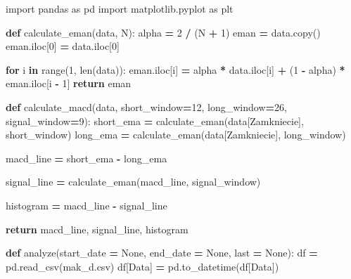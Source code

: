 \documentclass[
]{article}
\newenvironment{Shaded}{\begin{snugshade}}{\end{snugshade}}
\newcommand{\BuiltInTok}[1]{#1}
\newcommand{\ControlFlowTok}[1]{\textcolor[rgb]{0.13,0.29,0.53}{\textbf{#1}}}
\newcommand{\DecValTok}[1]{\textcolor[rgb]{0.00,0.00,0.81}{#1}}
\newcommand{\ImportTok}[1]{#1}
\newcommand{\KeywordTok}[1]{\textcolor[rgb]{0.13,0.29,0.53}{\textbf{#1}}}
\newcommand{\NormalTok}[1]{#1}
\newcommand{\OperatorTok}[1]{\textcolor[rgb]{0.81,0.36,0.00}{\textbf{#1}}}
\newcommand{\StringTok}[1]{\textcolor[rgb]{0.31,0.60,0.02}{#1}}
\newcommand{\VariableTok}[1]{\textcolor[rgb]{0.00,0.00,0.00}{#1}}
\begin{document}
\begin{Shaded}
\begin{Highlighting}[]
\ImportTok{import}\NormalTok{ pandas }\ImportTok{as}\NormalTok{ pd}
\ImportTok{import}\NormalTok{ matplotlib.pyplot }\ImportTok{as}\NormalTok{ plt}

\KeywordTok{def}\NormalTok{ calculate\_eman(data, N):}
\NormalTok{    alpha }\OperatorTok{=} \DecValTok{2} \OperatorTok{/}\NormalTok{ (N }\OperatorTok{+} \DecValTok{1}\NormalTok{)}
\NormalTok{    eman }\OperatorTok{=}\NormalTok{ data.copy()}
\NormalTok{    eman.iloc[}\DecValTok{0}\NormalTok{] }\OperatorTok{=}\NormalTok{ data.iloc[}\DecValTok{0}\NormalTok{]}

    \ControlFlowTok{for}\NormalTok{ i }\KeywordTok{in} \BuiltInTok{range}\NormalTok{(}\DecValTok{1}\NormalTok{, }\BuiltInTok{len}\NormalTok{(data)):}
\NormalTok{        eman.iloc[i] }\OperatorTok{=}\NormalTok{ alpha }\OperatorTok{*}\NormalTok{ data.iloc[i] }\OperatorTok{+}\NormalTok{ (}\DecValTok{1} \OperatorTok{{-}}\NormalTok{ alpha) }\OperatorTok{*}\NormalTok{ eman.iloc[i }\OperatorTok{{-}} \DecValTok{1}\NormalTok{]}
    \ControlFlowTok{return}\NormalTok{ eman}

\KeywordTok{def}\NormalTok{ calculate\_macd(data, short\_window}\OperatorTok{=}\DecValTok{12}\NormalTok{, long\_window}\OperatorTok{=}\DecValTok{26}\NormalTok{, signal\_window}\OperatorTok{=}\DecValTok{9}\NormalTok{):}
\NormalTok{    short\_ema }\OperatorTok{=}\NormalTok{ calculate\_eman(data[}\StringTok{\textquotesingle{}Zamkniecie\textquotesingle{}}\NormalTok{], short\_window)}
\NormalTok{    long\_ema }\OperatorTok{=}\NormalTok{ calculate\_eman(data[}\StringTok{\textquotesingle{}Zamkniecie\textquotesingle{}}\NormalTok{], long\_window)}

\NormalTok{    macd\_line }\OperatorTok{=}\NormalTok{ short\_ema }\OperatorTok{{-}}\NormalTok{ long\_ema}

\NormalTok{    signal\_line }\OperatorTok{=}\NormalTok{ calculate\_eman(macd\_line, signal\_window)}

\NormalTok{    histogram }\OperatorTok{=}\NormalTok{ macd\_line }\OperatorTok{{-}}\NormalTok{ signal\_line}

    \ControlFlowTok{return}\NormalTok{ macd\_line, signal\_line, histogram}

\KeywordTok{def}\NormalTok{ analyze(start\_date }\OperatorTok{=} \VariableTok{None}\NormalTok{, end\_date }\OperatorTok{=} \VariableTok{None}\NormalTok{, last }\OperatorTok{=} \VariableTok{None}\NormalTok{):}
\NormalTok{    df }\OperatorTok{=}\NormalTok{ pd.read\_csv(}\StringTok{\textquotesingle{}mak\_d.csv\textquotesingle{}}\NormalTok{)}
\NormalTok{    df[}\StringTok{\textquotesingle{}Data\textquotesingle{}}\NormalTok{] }\OperatorTok{=}\NormalTok{ pd.to\_datetime(df[}\StringTok{\textquotesingle{}Data\textquotesingle{}}\NormalTok{])}


\end{Highlighting}
\end{Shaded}
\end{document}
